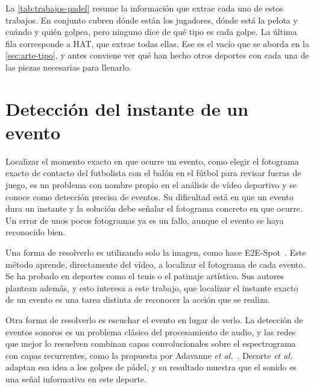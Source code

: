 La \cref{tab:trabajos-padel} resume la información que extrae cada uno de estos trabajos.
En conjunto cubren dónde están los jugadores, dónde está la pelota y cuándo y quién golpea, pero ninguno dice de qué tipo es cada golpe.
La última fila corresponde a HAT, que extrae todas ellas.
Ese es el vacío que se aborda en la \cref{sec:arte-tipo}, y antes conviene ver qué han hecho otros deportes con cada una de las piezas necesarias para llenarlo.

\begin{table}[htbp]
  \centering
  \caption{Información que extrae del vídeo cada trabajo de pádel. La marca indica que se obtiene de forma automática, y ``Manual'', que se marca a mano.}
  \label{tab:trabajos-padel}
  
\end{table}

\section{Detección del instante de un evento}
\label{sec:arte-instante}

Localizar el momento exacto en que ocurre un evento, como elegir el fotograma exacto de contacto del futbolista con el balón en el fútbol para revisar fueras de juego, es un problema con nombre propio en el análisis de vídeo deportivo y se conoce como detección precisa de eventos.
Su dificultad está en que un evento dura un instante y la solución debe señalar el fotograma concreto en que ocurre.
Un error de unos pocos fotogramas ya es un fallo, aunque el evento se haya reconocido bien.

Una forma de resolverlo es utilizando solo la imagen, como hace E2E-Spot~\cite{hong2022e2espot}.
Este método aprende, directamente del vídeo, a localizar el fotograma de cada evento.
Se ha probado en deportes como el tenis o el patinaje artístico.
Sus autores plantean además, y esto interesa a este trabajo, que localizar el instante exacto de un evento es una tarea distinta de reconocer la acción que se realiza.

Otra forma de resolverlo es escuchar el evento en lugar de verlo.
La detección de eventos sonoros es un problema clásico del procesamiento de audio, y las redes que mejor lo resuelven combinan capas convolucionales sobre el espectrograma con capas recurrentes, como la propuesta por Adavanne \textit{et al.}~\cite{adavanne2017sed}.
Decorte \textit{et al.} adaptan esa idea a los golpes de pádel, y su resultado muestra que el sonido es una señal informativa en este deporte.

